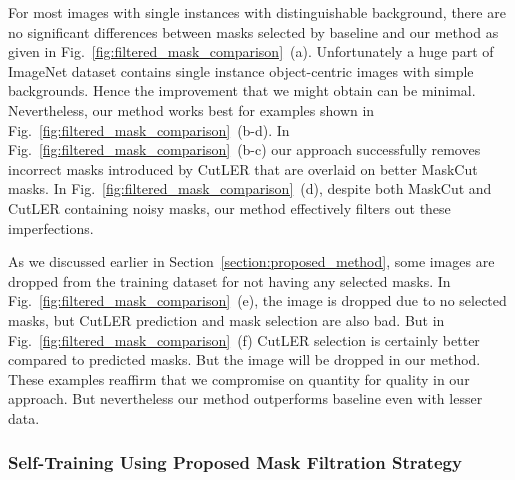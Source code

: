 For most images with single instances with distinguishable background, there are no significant differences between masks selected by baseline and our method as given in Fig.~\ref{fig:filtered_mask_comparison}~(a). Unfortunately a huge part of ImageNet dataset contains single instance object-centric images with simple backgrounds. Hence the improvement that we might obtain can be minimal. Nevertheless, our method works best for examples shown in Fig.~\ref{fig:filtered_mask_comparison}~(b-d). In Fig.~\ref{fig:filtered_mask_comparison}~(b-c) our approach successfully removes incorrect masks introduced by CutLER that are overlaid on better MaskCut masks. In Fig.~\ref{fig:filtered_mask_comparison}~(d), despite both MaskCut and CutLER containing noisy masks, our method effectively filters out these imperfections.

As we discussed earlier in Section~\ref{section:proposed_method}, some images are dropped from the training dataset for not having any selected masks. In Fig.~\ref{fig:filtered_mask_comparison}~(e), the image is dropped due to no selected masks, but CutLER prediction and mask selection are also bad. But in Fig.~\ref{fig:filtered_mask_comparison}~(f) CutLER selection is certainly better compared to predicted masks. But the image will be dropped in our method. These examples reaffirm that we compromise on quantity for quality in our approach. But nevertheless our method outperforms baseline even with lesser data.

\subsubsection{Self-Training Using Proposed Mask Filtration Strategy}

\begin{table}[htbp]
	\centering
	\caption[\textbf{\(AP_{box}\) and \(AP50_{box}\) for Initial Training and First Self-Training Round}]{\textbf{\(AP_{box}\) and \(AP50_{box}\) for Initial Training and Self-Training} evaluated on COCO validation set (Batch size 8) for model trained using our mask filtration during self-training.}
	\label{tab:combined_train_and_r1}
\end{table}


